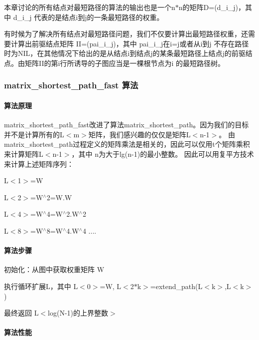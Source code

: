 本章讨论的所有结点对最短路径的算法的输出也是一个n$\ast$n的矩阵\+D=(d\+\_\+i\+\_\+j)，其中 d\+\_\+i\+\_\+j 代表的是结点i到j的一条最短路径的权重。

有时候为了解决所有结点对最短路径问题，我们不仅要计算出最短路径权重，还需要计算出前驱结点矩阵 I\+I=(pai\+\_\+i\+\_\+j)，其中 pai\+\_\+i\+\_\+j在i=j或者从i到j 不存在路径时为\+N\+I\+L，在其他情况下给出的是从结点i到结点j的某条最短路径上结点j的前驱结点。由矩阵\+I\+I的第i行所诱导的子图应当是一棵根节点为i 的最短路径树。

\subsubsection*{matrix\+\_\+shortest\+\_\+path\+\_\+fast 算法}

\paragraph*{算法原理}

matrix\+\_\+shortest\+\_\+path\+\_\+fast改进了算法matrix\+\_\+shortest\+\_\+path。因为我们的目标并不是计算所有的\+L$<$m$>$矩阵，我们感兴趣的仅仅是矩阵\+L$<$n-\/1$>$。 由matrix\+\_\+shortest\+\_\+path过程定义的矩阵乘法是相关的，因此可以仅用t个矩阵乘积来计算矩阵\+L$<$n-\/1$>$，其中 n为大于lg(n-\/1)的最小整数。 因此可以用复平方技术来计算上述矩阵序列：


\begin{DoxyItemize}
\item L$<$1$>$=W
\item L$<$2$>$=W$^\wedge$2=W.\+W
\item L$<$4$>$=W$^\wedge$4=W$^\wedge$2.W$^\wedge$2
\item L$<$8$>$=W$^\wedge$8=W$^\wedge$4.W$^\wedge$4 ....
\end{DoxyItemize}

\paragraph*{算法步骤}


\begin{DoxyItemize}
\item 初始化：从图中获取权重矩阵 W
\item 执行循环扩展\+L，其中 L$<$0$>$=W, L$<$2$\ast$k$>$=extend\+\_\+path(\+L$<$k$>$,\+L$<$k$>$)
\item 最终返回 L$<$log(N-\/1)的上界整数$>$
\end{DoxyItemize}

\paragraph*{算法性能}

